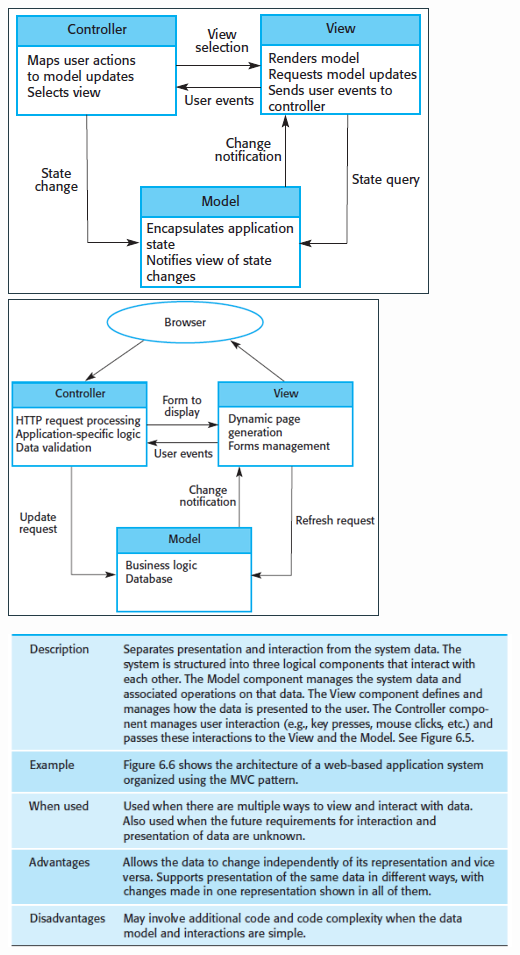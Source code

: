 \documentclass{article}
\begin{document}
    \includegraphics[scale=0.7]{model_view_controller.png}
    \includegraphics[scale=0.7]{model_view_controller-webbrowser.png}
    \begin{center}
        \includegraphics[scale=0.7]{model_view_controller-desc.png}
    \end{center}
\end{document}

